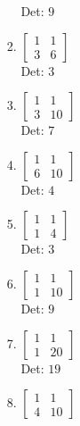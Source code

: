 \documentclass[12pt]{article}
\begin{document}
\begin{enumerate}
\begin{enumerate}
\begin{enumerate}
Det: $9$\\


\item $\displaystyle \left[\begin{matrix}1 & 1\\3 & 6\end{matrix}\right]$\\

Det: $3$\\


\item $\displaystyle \left[\begin{matrix}1 & 1\\3 & 10\end{matrix}\right]$\\

Det: $7$\\


\item $\displaystyle \left[\begin{matrix}1 & 1\\6 & 10\end{matrix}\right]$\\

Det: $4$\\


\item $\displaystyle \left[\begin{matrix}1 & 1\\1 & 4\end{matrix}\right]$\\

Det: $3$\\


\item $\displaystyle \left[\begin{matrix}1 & 1\\1 & 10\end{matrix}\right]$\\

Det: $9$\\


\item $\displaystyle \left[\begin{matrix}1 & 1\\1 & 20\end{matrix}\right]$\\

Det: $19$\\


\item $\displaystyle \left[\begin{matrix}1 & 1\\4 & 10\end{matrix}\right]$\\


\end{enumerate}
\end{enumerate}
\end{enumerate}
\end{document}
